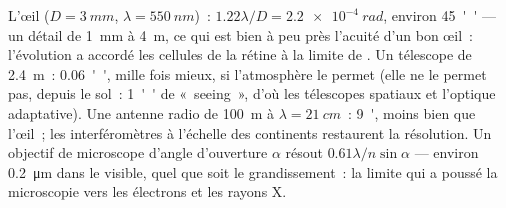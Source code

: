 \begin{example}\label{ex:b2:diffraction:instruments}
L'œil ($D = \qty{3}{mm}$, $\lambda = \qty{550}{nm}$)~: $1.22\lambda/D = \qty{2.2e-4}{rad}$, environ
\qty{45}{''} --- un détail de \qty{1}{mm} à \qty{4}{m}, ce qui est bien à peu près
l'acuité d'un bon œil~: l'évolution a accordé les cellules de la rétine à la
limite de . Un télescope de \qty{2.4}{m}~: \qty{0.06}{''}, mille fois
mieux, si l'atmosphère le permet (elle ne le permet pas, depuis le sol~:
\qty{1}{''} de «~seeing~», d'où les télescopes spatiaux et l'optique adaptative). Une
antenne radio de \qty{100}{m} à $\lambda = \qty{21}{cm}$~: \qty{9}{'}, moins bien que l'œil~;
les interféromètres à l'échelle des continents restaurent la résolution. Un
objectif de microscope d'angle d'ouverture $\alpha$ résout $0.61\lambda/n\sin\alpha$
--- environ \qty{0.2}{\micro m} dans le visible, quel que soit le grandissement~: la
limite qui a poussé la microscopie vers les électrons et les rayons X.
\end{example}

